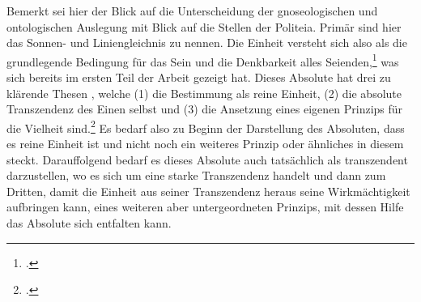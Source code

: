 Bemerkt sei hier der Blick auf die Unterscheidung der gnoseologischen und ontologischen Auslegung mit Blick auf die Stellen der Politeia. Primär sind hier das Sonnen- und Liniengleichnis zu nennen. 
Die Einheit versteht sich also als die grundlegende Bedingung für das Sein und die Denkbarkeit alles Seienden,\footcite[vgl.][S. 97]{halfwassen2015spuren} was sich bereits im ersten Teil der Arbeit gezeigt hat.
Dieses Absolute hat drei zu klärende Thesen
, welche (1) die Bestimmung als reine Einheit, (2) die absolute Transzendenz des Einen selbst und (3) die Ansetzung eines eigenen Prinzips für die Vielheit sind.\footcite[vgl.][S. 96]{halfwassen2015spuren}
Es bedarf also zu Beginn der Darstellung des Absoluten, dass es reine Einheit ist und nicht noch ein weiteres Prinzip oder ähnliches in diesem steckt. Darauffolgend bedarf es dieses Absolute auch tatsächlich als transzendent darzustellen, wo es sich um eine starke Transzendenz handelt und dann zum Dritten, damit die Einheit aus seiner Transzendenz heraus seine Wirkmächtigkeit aufbringen kann, eines weiteren aber untergeordneten Prinzips, mit dessen Hilfe das Absolute sich entfalten kann.\\
